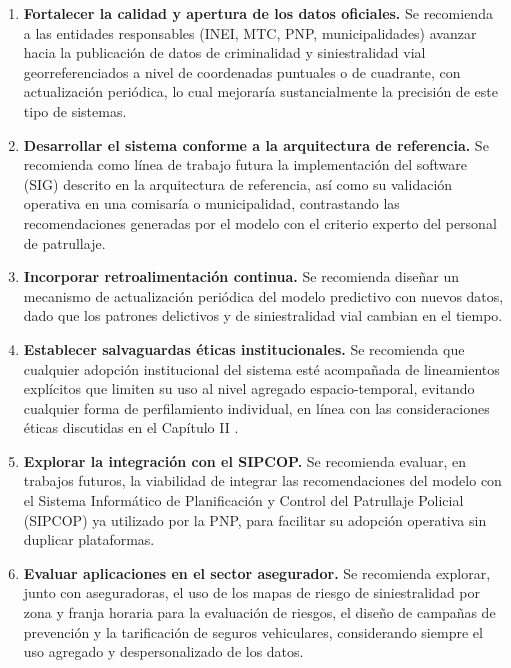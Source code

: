 \begin{enumerate}
    \item \textbf{Fortalecer la calidad y apertura de los datos oficiales.} Se recomienda a las entidades responsables (INEI, MTC, PNP, municipalidades) avanzar hacia la publicaci\'on de datos de criminalidad y siniestralidad vial georreferenciados a nivel de coordenadas puntuales o de cuadrante, con actualizaci\'on peri\'odica, lo cual mejorar\'ia sustancialmente la precisi\'on de este tipo de sistemas.
    \item \textbf{Desarrollar el sistema conforme a la arquitectura de referencia.} Se recomienda como l\'inea de trabajo futura la implementaci\'on del software (SIG) descrito en la arquitectura de referencia, as\'i como su validaci\'on operativa en una comisar\'ia o municipalidad, contrastando las recomendaciones generadas por el modelo con el criterio experto del personal de patrullaje.
    \item \textbf{Incorporar retroalimentaci\'on continua.} Se recomienda dise\~nar un mecanismo de actualizaci\'on peri\'odica del modelo predictivo con nuevos datos, dado que los patrones delictivos y de siniestralidad vial cambian en el tiempo.
    \item \textbf{Establecer salvaguardas \'eticas institucionales.} Se recomienda que cualquier adopci\'on institucional del sistema est\'e acompa\~nada de lineamientos expl\'icitos que limiten su uso al nivel agregado espacio-temporal, evitando cualquier forma de perfilamiento individual, en l\'inea con las consideraciones \'eticas discutidas en el Cap\'itulo II \citep{perry2013predictive}.
    \item \textbf{Explorar la integraci\'on con el SIPCOP.} Se recomienda evaluar, en trabajos futuros, la viabilidad de integrar las recomendaciones del modelo con el Sistema Inform\'atico de Planificaci\'on y Control del Patrullaje Policial (SIPCOP) ya utilizado por la PNP, para facilitar su adopci\'on operativa sin duplicar plataformas.
    \item \textbf{Evaluar aplicaciones en el sector asegurador.} Se recomienda explorar, junto con aseguradoras, el uso de los mapas de riesgo de siniestralidad por zona y franja horaria para la evaluaci\'on de riesgos, el dise\~no de campa\~nas de prevenci\'on y la tarificaci\'on de seguros vehiculares, considerando siempre el uso agregado y despersonalizado de los datos.
\end{enumerate}

\newpage

